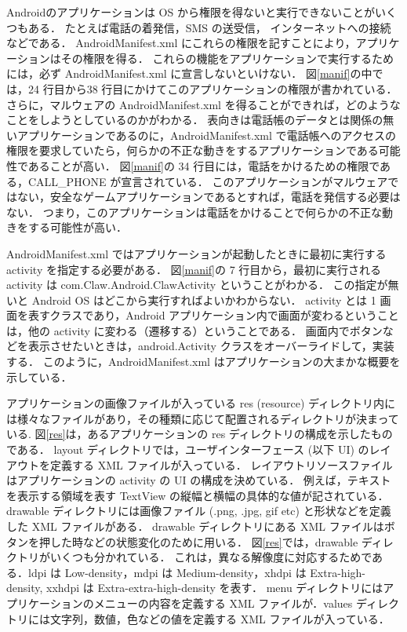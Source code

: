 Androidのアプリケーションは OS から権限を得ないと実行できないことがいくつもある．
たとえば電話の着発信，SMS の送受信， インターネットへの接続などである．
AndroidManifest.xml にこれらの権限を記すことにより，アプリケーションはその権限を得る．
これらの機能をアプリケーションで実行するためには，必ず AndroidManifest.xml に宣言しないといけない．
図\ref{manif}の中では，24 行目から38 行目にかけてこのアプリケーションの権限が書かれている．
さらに，マルウェアの AndroidManifest.xml を得ることができれば，どのようなことをしようとしているのかがわかる．
表向きは電話帳のデータとは関係の無いアプリケーションであるのに，AndroidManifest.xml で電話帳へのアクセスの権限を要求していたら，何らかの不正な動きをするアプリケーションである可能性であることが高い．
図\ref{manif}の 34 行目には，電話をかけるための権限である，CALL\_PHONE が宣言されている．
このアプリケーションがマルウェアではない，安全なゲームアプリケーションであるとすれば，電話を発信する必要はない．
つまり，このアプリケーションは電話をかけることで何らかの不正な動きをする可能性が高い．
 
 AndroidManifest.xml ではアプリケーションが起動したときに最初に実行する activity を指定する必要がある．
図\ref{manif}の 7 行目から，最初に実行される activity は com.Claw.Android.ClawActivity ということがわかる．
この指定が無いと Android OS はどこから実行すればよいかわからない．
activity とは 1 画面を表すクラスであり，Android アプリケーション内で画面が変わるということは，他の activity に変わる（遷移する）ということである．
画面内でボタンなどを表示させたいときは，android.Activity クラスをオーバーライドして，実装する．
このように，AndroidManifest.xml はアプリケーションの大まかな概要を示している．

アプリケーションの画像ファイルが入っている res (resource) ディレクトリ内には様々なファイルがあり，その種類に応じて配置されるディレクトリが決まっている\cite{resource}.
図\ref{res}は，あるアプリケーションの res ディレクトリの構成を示したものである．
layout  ディレクトリでは，ユーザインターフェース (以下 UI) のレイアウトを定義する XML ファイルが入っている．
レイアウトリソースファイルはアプリケーションの activity の UI の構成を決めている．
例えば，テキストを表示する領域を表す TextView の縦幅と横幅の具体的な値が記されている．
drawable ディレクトリには画像ファイル (.png, .jpg, gif etc) と形状などを定義した XML ファイルがある．
drawable ディレクトリにある XML ファイルはボタンを押した時などの状態変化のために用いる．
図\ref{res}では，drawable ディレクトリがいくつも分かれている．
これは，異なる解像度に対応するためである．ldpi は Low-density，mdpi は Medium-density，xhdpi は Extra-high-density, xxhdpi は Extra-extra-high-density を表す．
menu ディレクトリにはアプリケーションのメニューの内容を定義する XML ファイルが．values  ディレクトリには文字列，数値，色などの値を定義する XML ファイルが入っている．

